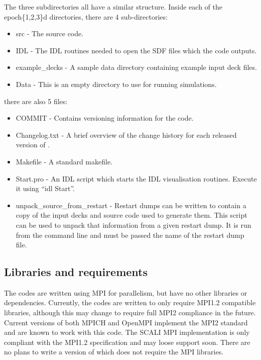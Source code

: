The three {\EPOCH} subdirectories all have a similar structure. Inside each
of the epoch\{1,2,3\}d directories, there are 4 sub-directories:

\begin{itemize}
\item src - The {\EPOCH} source code.
\item IDL - The IDL routines needed to open the SDF files which the code
  outputs.
\item example\_decks - A sample data directory containing example input deck
  files.
\item Data - This is an empty directory to use for running simulations.
\end{itemize}

there are also 5 files:

\begin{itemize}
\item COMMIT - Contains versioning information for the code.
\item Changelog.txt - A brief overview of the change history for each
  released version of {\EPOCH}.
\item Makefile - A standard makefile.
\item Start.pro - An IDL script which starts the IDL visualisation
  routines. Execute it using ``idl Start''.
\item unpack\_source\_from\_restart - Restart dumps can be written to contain
  a copy of the input decks and source code used to generate them. This script
  can be used to unpack that information from a given restart dump. It is run
  from the command line and must be passed the name of the restart dump file.
\end{itemize}


\subsection{Libraries and requirements}
The {\EPOCH} codes are written using MPI for parallelism, but have no other
libraries or dependencies. Currently, the codes are written to only require
MPI1.2 compatible libraries, although this may change to require full MPI2
compliance in the future. Current versions of both MPICH and OpenMPI implement
the MPI2 standard and are known to work with this code. The SCALI MPI
implementation is only compliant with the MPI1.2 specification and may loose
support soon.
There are no plans to write a version of {\EPOCH} which does not require
the MPI libraries.

